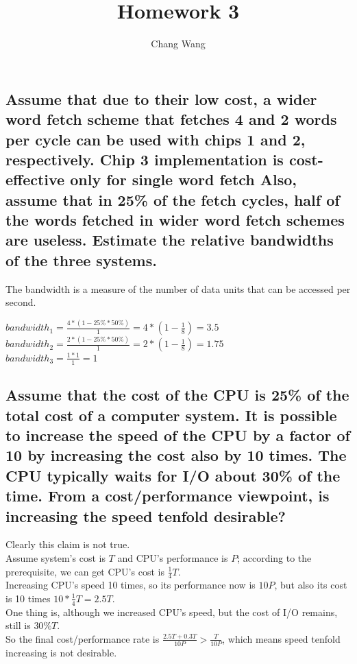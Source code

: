 \documentclass[12pt,a4paper]{report}
\title{Homework 3}
\author{Chang Wang}
\begin{document}
\maketitle

\section{}
\subsection{Assume that due to their low cost, a wider word fetch scheme that fetches 4 and 2 words per cycle can be used with chips 1 and 2, respectively. Chip 3 implementation is cost-effective only for single word fetch Also, assume that in 25\% of the fetch cycles, half of the words fetched in wider word fetch schemes are useless. Estimate the relative bandwidths of the three systems.}

The bandwidth is a measure of the number of data units that can be accessed per second. \\
\begin{center}
\end{center}
$bandwidth_{1} = \frac {4 * (1 - 25\% * 50\%)} {1} = 4 * (1 - \frac {1} {8}) = 3.5$ \\[1cm]
$bandwidth_{2} = \frac {2 * (1 - 25\% * 50\%)} {1} = 2 * (1 - \frac {1} {8}) = 1.75$ \\[1cm]
$bandwidth_{3} = \frac {1 * 1} {1} = 1$

\subsection{Assume that the cost of the CPU is 25\% of the total cost of a computer system. It is possible to increase the speed of the CPU by a factor of 10 by increasing the cost also by 10 times. The CPU typically waits for I/O about 30\% of the time. From a cost/performance viewpoint, is increasing the speed tenfold desirable?}

Clearly this claim is not true. \\[0.3cm]
Assume system's cost is $T$ and CPU's performance is $P$; according to the prerequisite, we can get CPU's cost is $\frac {1}{4} T$. \\[0.3cm]
Increasing CPU's speed 10 times, so its performance now is $10P$, but also its cost is 10 times $10*\frac{1}{4}T = 2.5T$. \\[0.3cm]
One thing is, although we increased CPU's speed, but the cost of I/O remains, still is $30\%T$. \\[0.3cm]
So the final cost/performance rate is $\frac{2.5T + 0.3T}{10P} > \frac{T}{10P}$, which means speed tenfold increasing is not desirable.
\end{document}
